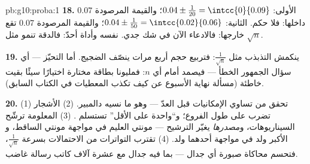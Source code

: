 \begin{solution}{pb:g10:proba:1}
\textbf{18.}  الأولى:  $0.04 \pm \frac{1}{20} =
\intcc{0}{0.09}$؛ والقيمة المرصودة $0.07$ داخلها: فلا حكم.
 الثانية: $0.04 \pm \frac{1}{50} = \intcc{0.02}{0.06}$؛ والقيمة
المرصودة $0.07$ تقع خارجها: فالادعاء الآن في شك
جدي.  نفسه وأداة أحدّ: فالدقة تنمو مثل
$\sqrt n$.

\textbf{19.} ينكمش التذبذب مثل $\frac{1}{\sqrt n}$:
فتربيع حجم  أربع مرات ينصّف الضجيج. أما التحيّز --- أي سؤال
الجمهور الخطأ --- فيصمد أمام أي $n$: فمليونا بطاقة مختارة اختيارًا
سيئًا بقيت خاطئة (مسألة نهاية الأسبوع عن كيف تكذب المعطيات في الكتاب السابق).

\textbf{20.} (1) تحقق من تساوي  الإمكانيات قبل
العدّ --- وهو ما نسيه دالمبير. (2) الأشجار تضرب على طول
الفروع؛ و``واحدة على الأقل'' تستسلم .
(3) المعلومة ترشّح السيناريوهات، و\emph{مصدرها}
يغيّر الترشيح --- مونتي العليم في مواجهة مونتي الساقط، و
الأكبر ولد في مواجهة أحدهما ولد. (4) تقترب التواترات من
الاحتمالات بسرعة $\frac{1}{\sqrt n}$، فتحسم محاكاة
صبورة أي جدال --- بما فيه جدال مع عشرة
آلاف كاتب رسالة غاضب.
\end{solution}

